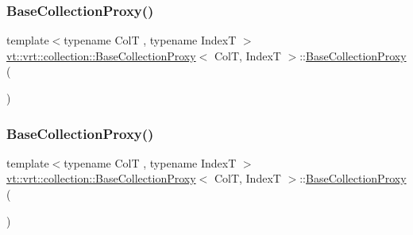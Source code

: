 \subsubsection{\texorpdfstring{Base\+Collection\+Proxy()}{BaseCollectionProxy()}\hspace{0.1cm}{\footnotesize\ttfamily [1/4]}}
{\footnotesize\ttfamily template$<$typename ColT , typename IndexT $>$ \\
\hyperlink{structvt_1_1vrt_1_1collection_1_1_base_collection_proxy}{vt\+::vrt\+::collection\+::\+Base\+Collection\+Proxy}$<$ ColT, IndexT $>$\+::\hyperlink{structvt_1_1vrt_1_1collection_1_1_base_collection_proxy}{Base\+Collection\+Proxy} (\begin{DoxyParamCaption}{ }\end{DoxyParamCaption})\hspace{0.3cm}{\ttfamily [default]}}

\mbox{\label{structvt_1_1vrt_1_1collection_1_1_base_collection_proxy_a60b492b42645010e757895f5552e55df}} 
\subsubsection{\texorpdfstring{Base\+Collection\+Proxy()}{BaseCollectionProxy()}\hspace{0.1cm}{\footnotesize\ttfamily [2/4]}}
{\footnotesize\ttfamily template$<$typename ColT , typename IndexT $>$ \\
\hyperlink{structvt_1_1vrt_1_1collection_1_1_base_collection_proxy}{vt\+::vrt\+::collection\+::\+Base\+Collection\+Proxy}$<$ ColT, IndexT $>$\+::\hyperlink{structvt_1_1vrt_1_1collection_1_1_base_collection_proxy}{Base\+Collection\+Proxy} (\begin{DoxyParamCaption}\item[{\hyperlink{structvt_1_1vrt_1_1collection_1_1_base_collection_proxy}{Base\+Collection\+Proxy}$<$ ColT, IndexT $>$ const \&}]{ }\end{DoxyParamCaption})\hspace{0.3cm}{\ttfamily [default]}}

\mbox{\label{structvt_1_1vrt_1_1collection_1_1_base_collection_proxy_a440dfc879237bd36076529c8da0ffca8}} 
